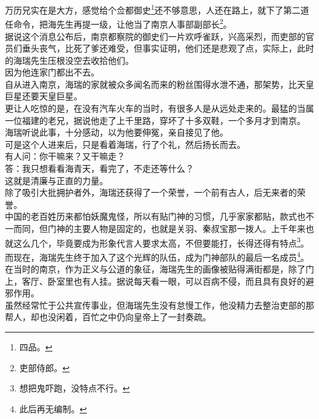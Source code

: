\begin{multicols}{\theparacolNo}
万历兄实在是大方，感觉给个佥都御史\footnote{四品。}还不够意思，人还在路上，就下了第二道任命令，把海先生再提一级，让他当了南京人事部副部长\footnote{吏部侍郎。}。\\

据说这个消息公布后，南京都察院的御史们一片欢呼雀跃，兴高采烈，而吏部的官员们垂头丧气，比死了爹还难受，但事实证明，他们还是悲观了点，实际上，此时的海瑞先生压根没空去收拾他们。\\

因为他连家门都出不去。\\

自从进入南京，海瑞的家就被众多闻名而来的粉丝围得水泄不通，那架势，比天皇巨星还要天皇巨星。\\

更让人吃惊的是，在没有汽车火车的当时，有很多人是从远处走来的。最猛的当属一位福建的老兄，据说他走了上千里路，穿坏了十多双鞋，一个多月才到南京。\\

海瑞听说此事，十分感动，以为他要伸冤，亲自接见了他。\\

可是这个人进来后，只是看着海瑞，行了个礼，然后扬长而去。\\

有人问：你干嘛来？又干嘛走？\\

答：我只想看看海青天，看完了，不走还等什么？\\

这就是清廉与正直的力量。\\

除了吸引大批拥护者外，海瑞还获得了一个荣誉，一个前有古人，后无来者的荣誉。\\

中国的老百姓历来都怕妖魔鬼怪，所以有贴门神的习惯，几乎家家都贴，款式也不一而同，但门神的主要人物是固定的，也就是关羽、秦叔宝那一拨人。上千年来也就这么几个，毕竟要成为形象代言人要求太高，不但要能打，长得还得有特点\footnote{想把鬼吓跑，没特点不行。}。\\

而现在，海瑞先生终于加入了这个光辉的队伍，成为门神部队的最后一名成员\footnote{此后再无编制。}。在当时的南京，作为正义与公道的象征，海瑞先生的画像被贴得满街都是，除了门上，客厅、卧室里也有人挂。据说每天看一眼，可以百病不侵，而且具有良好的避邪作用。\\

虽然经常忙于公共宣传事业，但海瑞先生没有怠慢工作，他没精力去整治吏部的那帮人，却也没闲着，百忙之中仍向皇帝上了一封奏疏。\\


\end{multicols}
